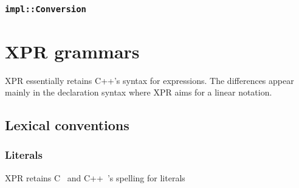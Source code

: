 \documentclass[a4paper,12pt]{article}
\begin{document}
\subsubsection{\texttt{impl::Conversion}}

\section{XPR grammars}
\label{sec:xpr-grammar}

XPR essentially retains C++'s syntax for expressions.  The differences appear
mainly in the declaration syntax where XPR aims for a linear notation.
\subsection{Lexical conventions}
\label{sec:xpr-grammar:lexical-convention}


\subsubsection{Literals}

XPR retains C~\cite{iso99} and C++~\cite{iso03}'s spelling for literals
\begin{Program}
  
\end{Program}




\end{document}
